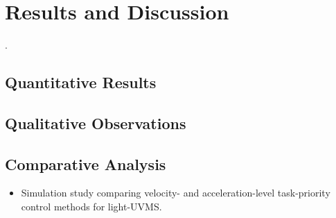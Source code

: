 
\section{Results and Discussion}
\label{sec:simulation:results}.
\subsection{Quantitative Results}
\subsection{Qualitative Observations}
\subsection{Comparative Analysis}

\begin{itemize}
    \item Simulation study comparing velocity- and acceleration-level task-priority
        control methods for light-UVMS.
\end{itemize}
